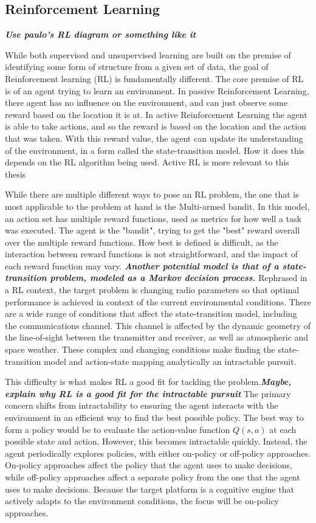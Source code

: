 	\subsection{Reinforcement Learning}
	\textbf{\textit{Use paulo's RL diagram or something like it}}
	\par While both supervised and unsupervised learning are built on the premise of identifying some form of structure from a given set of data, the goal of Reinforcement learning (RL) is fundamentally different. The core premise of RL is of an agent trying to learn an environment. In passive Reinforcement Learning, there agent has no influence on the environment, and can just observe some reward based on the location it is at. In active Reinforcement Learning the agent is able to take actions, and so the reward is based on the location and the action that was taken. With this reward value, the agent can update its understanding of the environment, in a form called the state-transition model. How it does this depends on the RL algorithm being used. Active RL is more relevant to this thesis
	\par While there are multiple different ways to pose an RL problem, the one that is most applicable to the problem at hand is the Multi-armed bandit. In this model, an action set has multiple reward functions, used as metrics for how well a task was executed. 
	The agent is the "bandit", trying to get the "best" reward overall over the multiple reward functions. How best is defined is difficult, as the interaction between reward functions is not straightforward, and the impact of each reward function may vary. 
	 \textbf{\textit{Another potential model is that of a state-transition problem, modeled as a Markov decision process.}} Rephrased in a RL context, the target problem is changing radio parameters so that optimal performance is achieved in context of the current environmental conditions. There are a wide range of conditions that affect the state-transition model, including the communications channel. This channel is affected by the dynamic geometry of the line-of-sight between the transmitter and receiver, as well as atmospheric and space weather. These complex and changing conditions make finding the state-transition model and action-state mapping analytically an intractable pursuit. 
	\par This difficulty is what makes RL a good fit for tackling the problem.\textbf{\textit{Maybe, explain why RL is a good fit for the intractable pursuit}} The primary concern shifts from intractability to ensuring the agent interacts with the environment in an efficient way to find the best possible policy. The best way to form a policy would be to evaluate the action-value function $Q(s,a)$ at each possible state and action. However, this becomes intractable quickly. Instead, the agent periodically explores policies, with either on-policy or off-policy approaches. On-policy approaches affect the policy that the agent uses to make decisions, while off-policy approaches affect a separate policy from the one that the agent uses to make decisions. Because the target platform is a cognitive engine that actively adapts to the environment conditions, the focus will be on-policy approaches. 
